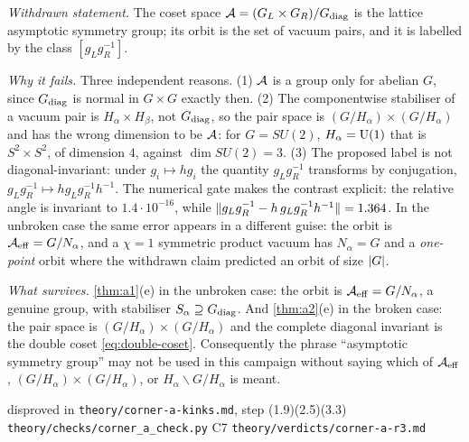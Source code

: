 \begin{refutedclaim}
\label{ref:a2-orbit}
\normalfont
\statusRefuted\;
\emph{Withdrawn statement.}  The coset space $\mathcal{A}=(G_L\times G_R)/G_{\mathrm{diag}}$ is the
lattice asymptotic symmetry group; its orbit is the set of vacuum pairs, and it
is labelled by the class $[g_Lg_R^{-1}]$.

\smallskip\noindent
\emph{Why it fails.}  Three independent reasons.  (1) $\mathcal{A}$ is a group only for
abelian $G$, since $G_{\mathrm{diag}}$ is normal in $G\times G$ exactly then.  (2) The
componentwise stabiliser of a vacuum pair is $H_{\alpha}\times H_{\beta}$, not
$G_{\mathrm{diag}}$, so the pair space is $(G/H_\alpha)\times(G/H_\alpha)$ and has the wrong
dimension to be $\mathcal{A}$: for $G=SU(2)$, $H_\alpha=\operatorname{U}(1)$ that is
$S^2\times S^2$, of dimension $4$, against $\dim SU(2)=3$.  (3) The proposed
label is not diagonal-invariant: under $g_i\mapsto hg_i$ the quantity
$g_Lg_R^{-1}$ transforms by conjugation, $g_Lg_R^{-1}\mapsto hg_Lg_R^{-1}h^{-1}$.
The numerical gate makes the contrast explicit: the relative angle is invariant to
$1.4\cdot10^{-16}$, while
$\lVert g_Lg_R^{-1}-h\,g_Lg_R^{-1}h^{-1}\rVert=1.364$.  In the unbroken case the same
error appears in a different guise: the orbit is $\mathcal{A}_{\mathrm{eff}}=G/N_\alpha$, and a
$\chi=1$ symmetric product vacuum has $N_\alpha=G$ and a \emph{one-point} orbit
where the withdrawn claim predicted an orbit of size $\lvert G\rvert$.

\smallskip\noindent
\emph{What survives.}  \cref{thm:a1}(e) in the unbroken case: the orbit is
$\mathcal{A}_{\mathrm{eff}}=G/N_\alpha$, a genuine group, with stabiliser
$S_\alpha\supseteq G_{\mathrm{diag}}$.  And \cref{thm:a2}(e) in the broken case: the pair
space is $(G/H_\alpha)\times(G/H_\alpha)$ and the complete diagonal invariant is
the double coset \cref{eq:double-coset}.  Consequently the phrase ``asymptotic
symmetry group'' may not be used in this campaign without saying which of
$\mathcal{A}_{\mathrm{eff}}$, $(G/H_\alpha)\times(G/H_\alpha)$, or $H_\alpha\backslash G/H_\alpha$ is
meant.
\end{refutedclaim}

%
{disproved in \texttt{theory/corner-a-kinks.md}, step (1.9)(2.5)(3.3)}%
{\texttt{theory/checks/corner\_a\_check.py} C7}%
{\texttt{theory/verdicts/corner-a-r3.md}}

